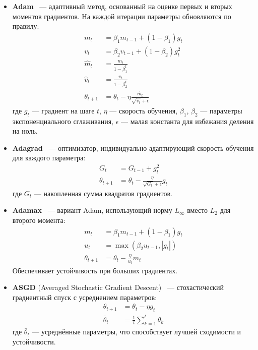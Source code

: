 \begin{itemize}
    \item \textbf{Adam}~\cite{kingma2014adam} --- адаптивный метод, основанный на оценке первых и вторых моментов градиентов. На каждой итерации параметры обновляются по правилу:
    \[
    \begin{aligned}
        m_t &= \beta_1 m_{t-1} + (1 - \beta_1) g_t \\
        v_t &= \beta_2 v_{t-1} + (1 - \beta_2) g_t^2 \\
        \hat{m}_t &= \frac{m_t}{1 - \beta_1^t} \\
        \hat{v}_t &= \frac{v_t}{1 - \beta_2^t} \\
        \theta_{t+1} &= \theta_t - \eta \frac{\hat{m}_t}{\sqrt{\hat{v}_t} + \epsilon}
    \end{aligned}
    \]
    где $g_t$ --- градиент на шаге $t$, $\eta$ --- скорость обучения, $\beta_1$, $\beta_2$ --- параметры экспоненциального сглаживания, $\epsilon$ --- малая константа для избежания деления на ноль.

    \item \textbf{Adagrad}~\cite{duchi2011adaptive} --- оптимизатор, индивидуально адаптирующий скорость обучения для каждого параметра:
    \[
    \begin{aligned}
        G_t &= G_{t-1} + g_t^2 \\
        \theta_{t+1} &= \theta_t - \frac{\eta}{\sqrt{G_t} + \epsilon} g_t
    \end{aligned}
    \]
    где $G_t$ --- накопленная сумма квадратов градиентов.

    \item \textbf{Adamax}~\cite{kingma2014adam} --- вариант Adam, использующий норму $L_\infty$ вместо $L_2$ для второго момента:
    \[
    \begin{aligned}
        m_t &= \beta_1 m_{t-1} + (1 - \beta_1) g_t \\
        u_t &= \max(\beta_2 u_{t-1}, |g_t|) \\
        \theta_{t+1} &= \theta_t - \frac{\eta}{u_t} m_t
    \end{aligned}
    \]
    Обеспечивает устойчивость при больших градиентах.

    \item \textbf{ASGD} (Averaged Stochastic Gradient Descent)~\cite{polyak1992acceleration} --- стохастический градиентный спуск с усреднением параметров:
    \[
    \begin{aligned}
        \theta_{t+1} &= \theta_t - \eta g_t \\
        \bar{\theta}_t &= \frac{1}{t} \sum_{k=1}^{t} \theta_k
    \end{aligned}
    \]
    где $\bar{\theta}_t$ --- усреднённые параметры, что способствует лучшей сходимости и устойчивости.


\end{itemize}
